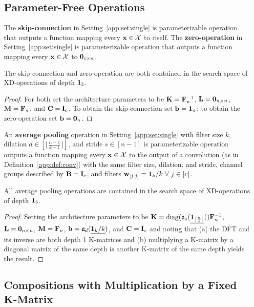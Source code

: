 \subsection{Parameter-Free Operations}

\begin{Def}\label{app:def:skip}
	The {\bf skip-connection} in Setting~\ref{app:set:single} is parameterizable operation that outputs a function mapping every $\mathbf{x}\in\mathcal X$ to itself.
	The {\bf zero-operation} in Setting~\ref{app:set:single} is parameterizable operation that outputs a function mapping every $\mathbf{x}\in\mathcal X$ to $\mathbf 0_{c\times n}$.
\end{Def}
\begin{Clm}\label{app:clm:skip}
	The skip-connection and zero-operation are both contained in the search space of XD-operations of depth $\mathbf 1_3$.
\end{Clm}
\begin{proof}
	For both set the architecture parameters to be $\mathbf{K}=\mathbf{F}_n^{-1}$, $\mathbf{L}=\mathbf 0_{n\times n}$, $\mathbf{M}=\mathbf{F}_n$, and $\mathbf{C}=\mathbf{I}_c$.
	To obtain the skip-connection set $\mathbf{b}=\mathbf 1_n$;
	to obtain the zero-operation set $\mathbf{b}=\mathbf 0_n$.
\end{proof}

\begin{Def}\label{app:def:avgp}
	An {\bf average pooling} operation in Setting~\ref{app:set:single} with filter size $k$, dilation $d\in[\lfloor\frac{n-1}{k-1}\rfloor]$, and stride $s\in[n-1]$ is parameterizable operation outputs a function mapping every $\mathbf{x}\in\mathcal X$ to the output of a convolution (as in Definition~\ref{app:def:conv}) with the same filter size, dilation, and stride, channel groups described by $\mathbf{B}=\mathbf{I}_c$, and filters $\mathbf{w}_{[j,j]}=\mathbf 1_k/k~\forall~j\in[c]$.
\end{Def}
\begin{Clm}\label{app:clm:avgp}
	All average pooling operations are contained in the search space of XD-operations of depth $\mathbf 1_3$.
\end{Clm}
\begin{proof}
	Setting the architecture parameters to be $\mathbf{K}=\operatorname{\operatorname{diag}}(\mathfrak{a}_s(\underline{\mathbf 1_{\lceil\frac ns\rceil}}))\mathbf{F}_n^{-1}$, $\mathbf{L}=\mathbf 0_{n\times n}$, $\mathbf{M}=\mathbf{F}_n$, $\mathbf{b}=\mathfrak{a}_d(\underline{\mathbf 1_k/k})$, and $\mathbf{C}=\mathbf{I}_c$ and noting that (a) the DFT and its inverse are both depth 1 K-matrices and (b) multiplying a K-matrix by a diagonal matrix of the same depth is another K-matrix of the same depth yields the result.
\end{proof}

\subsection{Compositions with Multiplication by a Fixed K-Matrix}

